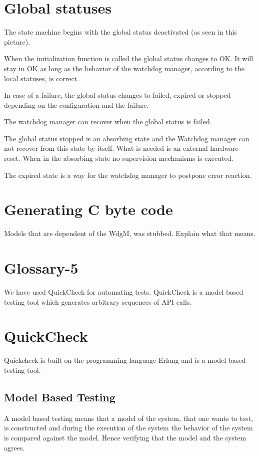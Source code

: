 \documentclass[a4paper]{article}
\begin{document}
\section{Global statuses}
The state machine begins with the global status deactivated (as seen
in this picture).

When the initialization function is called the global status changes
to OK.
It will stay in OK as long as the behavior of the watchdog manager,
according to the local statuses, is correct.

In case of a failure, the global status changes to failed, expired or
stopped depending on the configuration and the failure.

The watchdog manager can recover when the global status is failed.

The global status stopped is an absorbing state and the Watchdog
manager can not recover from this state by itself. What is needed is
an external hardware reset. When in the absorbing state no supervision
mechanisms is executed.

The expired state is a way for the watchdog manager to postpone error
reaction.

\section{Generating C byte code}
Models that are dependent of the WdgM, was stubbed. Explain what that means.

\section{Glossary-5}
We have used QuickCheck for automating tests. QuickCheck is a model
based testing tool which generates arbitrary sequences of API calls.


\section{QuickCheck}
Quickcheck is built on the programming language Erlang and is a model based
testing tool.

\subsection{Model Based Testing}
A model based testing means that a model of the system, that one wants to test,
is constructed and during the execution of the system the behavior of the system is
compared against the model. Hence verifying that the model and the system agrees.
\end{document}
